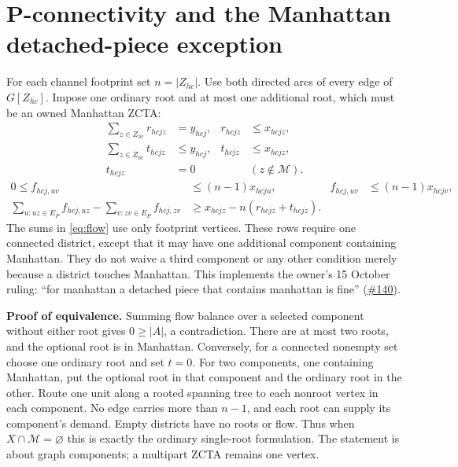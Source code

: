 \documentclass[11pt,letterpaper]{article}
\newcommand{\issue}[1]{\href{https://github.com/helios1168/td/issues/#1}{\##1}}
\begin{document}
\section{P-connectivity and the Manhattan detached-piece exception}\label{sec:P}
For each channel footprint set $n=|Z_{hc}|$. Use both directed arcs of every
edge of $G[Z_{hc}]$. Impose one ordinary root and at most one additional root,
which must be an owned Manhattan ZCTA:
\begin{equation}\label{eq:roots}
\begin{aligned}
 \sum_{z\in Z_{hc}}r_{hcjz}&=y_{hcj},& r_{hcjz}&\le x_{hcjz},\\
 \sum_{z\in Z_{hc}}t_{hcjz}&\le y_{hcj},&t_{hcjz}&\le x_{hcjz},\\
 t_{hcjz}&=0 &&(z\notin\mathcal M).
\end{aligned}
\end{equation}
\begin{equation}\label{eq:flow}
\begin{aligned}
 0\le f_{hcj,uv}&\le(n-1)x_{hcju},&
 f_{hcj,uv}&\le(n-1)x_{hcjv},\\
 \sum_{u:uz\in E_P}f_{hcj,uz}-\sum_{v:zv\in E_P}f_{hcj,zv}
 &\ge x_{hcjz}-n(r_{hcjz}+t_{hcjz}).
\end{aligned}
\end{equation}
The sums in \eqref{eq:flow} use only footprint vertices. These rows require
one connected district, except that it may have one additional component
containing Manhattan. They do not waive a third component or any other
condition merely because a district touches Manhattan. This implements the
owner's 15 October ruling: ``for manhattan a detached piece that contains
manhattan is fine'' (\issue{140}).

\textbf{Proof of equivalence.} Summing flow balance over a selected component
without either root gives $0\ge|A|$, a contradiction. There are at most two
roots, and the optional root is in Manhattan. Conversely, for a connected
nonempty set choose one ordinary root and set $t=0$. For two components,
one containing Manhattan, put the optional root in that component and the
ordinary root in the other. Route one unit along a rooted spanning tree to
each nonroot vertex in each component. No edge carries more than $n-1$,
and each root can supply its component's demand. Empty districts have no
roots or flow. Thus when $X\cap\mathcal M=\varnothing$ this is exactly the
ordinary single-root formulation. The statement is about graph components;
a multipart ZCTA remains one vertex.
\end{document}
